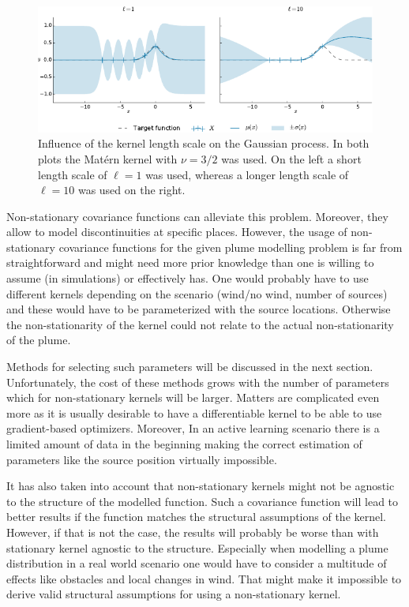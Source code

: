 \begin{figure}
    \centering
    \includegraphics{plots/gp-lengthscale}
    \caption[Length-scale influence]{Influence of the kernel length scale on the 
        Gaussian process. In both plots the Mat\'ern kernel with $\nu = 3/2$ was 
        used. On the left a short length scale of $\ell = 1$ was used, whereas 
        a longer length scale of $\ell = 10$ was used on the right.
    }\label{fig:gp-length scale}
\end{figure}

Non-stationary covariance functions can alleviate this problem. Moreover, they 
allow to model discontinuities at specific places. However, the usage of 
non-stationary covariance functions for the given plume modelling problem is far 
from straightforward and might need more prior knowledge than one is willing to 
assume (in simulations) or effectively has.  One would probably have to use 
different kernels depending on the scenario (wind/no wind, number of sources) 
and these would have to be parameterized with the source locations. Otherwise 
the non-stationarity of the kernel could not relate to the actual 
non-stationarity of the plume.

Methods for selecting such parameters will be discussed in the next section.  
Unfortunately, the cost of these methods grows with the number of parameters 
which for non-stationary kernels will be larger. Matters are complicated even 
more as it is usually desirable to have a differentiable kernel to be able to 
use gradient-based optimizers. Moreover, In an active learning scenario there is 
a limited amount of data in the beginning making the correct estimation of 
parameters like the source position virtually impossible.

It has also taken into account that non-stationary kernels might not be agnostic 
to the structure of the modelled function. Such a covariance function will lead 
to better results if the function matches the structural assumptions of the 
kernel. However, if that is not the case, the results will probably be worse 
than with stationary kernel agnostic to the structure. Especially when modelling 
a plume distribution in a real world scenario one would have to consider 
a multitude of effects like obstacles and local changes in wind.  That might 
make it impossible to derive valid structural assumptions for using 
a non-stationary kernel.

